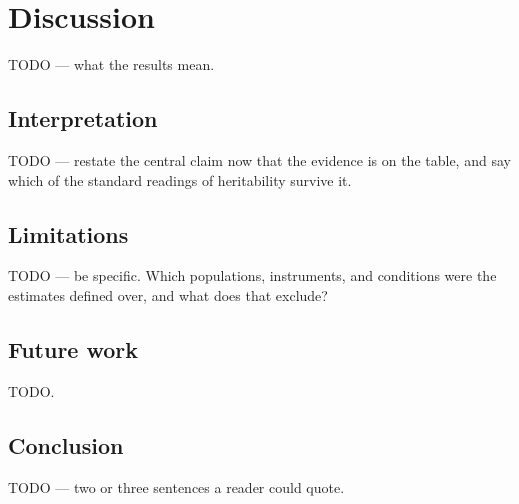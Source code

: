 \section{Discussion}
\label{sec:discussion}

TODO — what the results mean.

\subsection{Interpretation}

TODO — restate the central claim now that the evidence is on the table, and say which of the standard readings of heritability survive it.

\subsection{Limitations}

TODO — be specific. Which populations, instruments, and conditions were the estimates defined over, and what does that exclude?

\subsection{Future work}

TODO.

\subsection{Conclusion}

TODO — two or three sentences a reader could quote.
